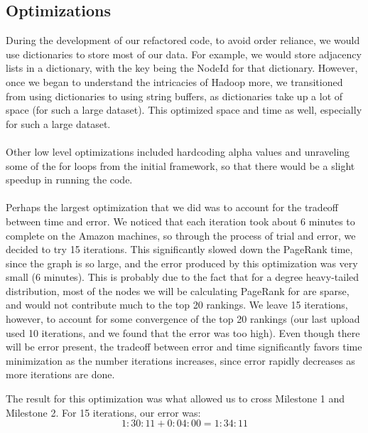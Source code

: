 \subsection*{Optimizations}
During the development of our refactored code, to avoid order reliance, we would use dictionaries to store most of our data. For example, we would store adjacency lists in a dictionary, with the key being the NodeId for that dictionary. However, once we began to understand the intricacies of Hadoop more, we transitioned from using dictionaries to using string buffers, as dictionaries take up a lot of space (for such a large dataset). This optimized space and time as well, especially for such a large dataset.
\\ \\
Other low level optimizations included hardcoding alpha values and unraveling some of the for loops from the initial framework, so that there would be a slight speedup in running the code.
\\ \\
Perhaps the largest optimization that we did was to account for the tradeoff between time and error. We noticed that each iteration took about 6 minutes to complete on the Amazon machines, so through the process of trial and error, we decided to try 15 iterations. This significantly slowed down the PageRank time, since the graph is so large, and the error produced by this optimization was very small (6 minutes). This is probably due to the fact that for a degree heavy-tailed distribution, most of the nodes we will be calculating PageRank for are sparse, and would not contribute much to the top 20 rankings. We leave 15 iterations, however, to account for some convergence of the top 20 rankings (our last upload used 10 iterations, and we found that the error was too high). Even though there will be error present, the tradeoff between error and time significantly favors time minimization as the number iterations increases, since error rapidly decreases as more iterations are done.

The result for this optimization was what allowed us to cross Milestone 1 and Milestone 2. For 15 iterations, our error was: $$1:30:11 + 0:04:00 = 1:34:11$$

